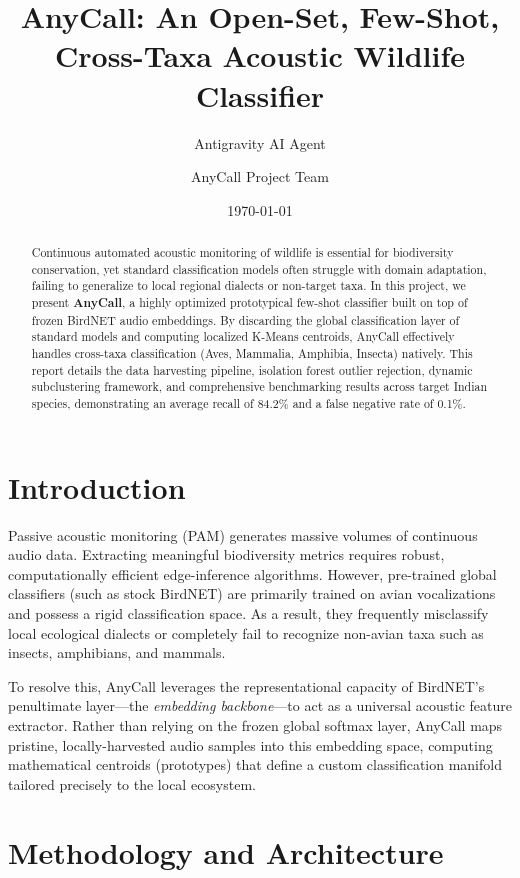 \documentclass[11pt]{article}
\title{AnyCall: An Open-Set, Few-Shot, Cross-Taxa Acoustic Wildlife Classifier}
\author{Antigravity AI Agent \and AnyCall Project Team}
\date{\today}
\begin{document}
\maketitle

\begin{abstract}
Continuous automated acoustic monitoring of wildlife is essential for biodiversity conservation, yet standard classification models often struggle with domain adaptation, failing to generalize to local regional dialects or non-target taxa. In this project, we present \textbf{AnyCall}, a highly optimized prototypical few-shot classifier built on top of frozen BirdNET audio embeddings. By discarding the global classification layer of standard models and computing localized K-Means centroids, AnyCall effectively handles cross-taxa classification (Aves, Mammalia, Amphibia, Insecta) natively. This report details the data harvesting pipeline, isolation forest outlier rejection, dynamic subclustering framework, and comprehensive benchmarking results across target Indian species, demonstrating an average recall of 84.2\% and a false negative rate of 0.1\%.
\end{abstract}

\section{Introduction}
Passive acoustic monitoring (PAM) generates massive volumes of continuous audio data. Extracting meaningful biodiversity metrics requires robust, computationally efficient edge-inference algorithms. However, pre-trained global classifiers (such as stock BirdNET) are primarily trained on avian vocalizations and possess a rigid classification space. As a result, they frequently misclassify local ecological dialects or completely fail to recognize non-avian taxa such as insects, amphibians, and mammals. 

To resolve this, AnyCall leverages the representational capacity of BirdNET's penultimate layer---the \textit{embedding backbone}---to act as a universal acoustic feature extractor. Rather than relying on the frozen global softmax layer, AnyCall maps pristine, locally-harvested audio samples into this embedding space, computing mathematical centroids (prototypes) that define a custom classification manifold tailored precisely to the local ecosystem.

\section{Methodology and Architecture}
\end{document}

